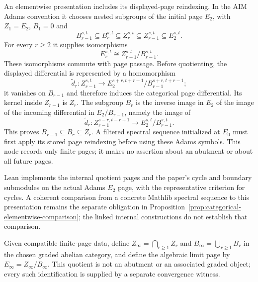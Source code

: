 \begin{definition}
  \label{def:ss-elementwise-page-presentation}
  \notready
  An elementwise presentation includes its displayed-page reindexing.  In the
  AIM Adams convention it chooses nested subgroups of the initial page
  $E_2$, with $Z_1=E_2$, $B_1=0$ and
  \[
    B_{r-1}^{s,t}\subseteq B_r^{s,t}\subseteq Z_r^{s,t}
      \subseteq Z_{r-1}^{s,t}\subseteq E_2^{s,t}.
  \]
  For every $r\ge2$ it supplies isomorphisms
  \[
    E_r^{s,t}\cong Z_{r-1}^{s,t}/B_{r-1}^{s,t}.
  \]
  These isomorphisms commute with page passage.  Before quotienting, the
  displayed differential is represented by a homomorphism
  \[
    \widetilde d_r:Z_{r-1}^{s,t}\longrightarrow
    E_2^{s+r,t+r-1}/B_{r-1}^{s+r,t+r-1};
  \]
  it vanishes on $B_{r-1}$ and therefore induces the categorical page
  differential.  Its kernel inside $Z_{r-1}$ is $Z_r$.  The subgroup $B_r$
  is the inverse image in $E_2$ of the image of the incoming differential in
  $E_2/B_{r-1}$, namely the image of
  \[
    \widetilde d_r:Z_{r-1}^{s-r,t-r+1}
      \longrightarrow E_2^{s,t}/B_{r-1}^{s,t}.
  \]
  This proves $B_{r-1}\subseteq B_r\subseteq Z_r$.
  A filtered spectral sequence initialized at $E_0$ must first apply its
  stored page reindexing before using these Adams symbols.  This node records
  only finite pages; it makes no assertion about an abutment or about all
  future pages.

  Lean implements the internal quotient pages and the paper's cycle and
  boundary submodules on the actual Adams $E_2$ page, with the representative
  criterion for cycles.  A coherent comparison from a concrete Mathlib
  spectral sequence to this presentation remains the separate obligation in
  Proposition~\ref{prop:categorical-elementwise-comparison}; the linked
  internal constructions do not establish that comparison.
\end{definition}

\begin{definition}
  \label{def:ss-einfty-presentation}
  \leanok
  Given compatible finite-page data, define
  $Z_\infty=\bigcap_{r\ge1}Z_r$ and
  $B_\infty=\bigcup_{r\ge1}B_r$ in the chosen graded abelian category, and
  define the algebraic limit page by $E_\infty=Z_\infty/B_\infty$.
  This quotient is not an abutment or an associated graded object; every such
  identification is supplied by a separate convergence witness.
\end{definition}

